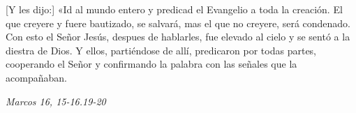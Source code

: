 \documentclass[../../devocionario.tex]{subfiles}
\begin{document}
    [Y les dijo:] «Id al mundo entero y predicad el Evangelio a toda la creación. El que creyere y fuere bautizado, 
    se salvará, mas el que no creyere, será condenado. Con esto el Señor Jesús, despues de hablarles, 
    fue elevado al cielo y se sentó a la diestra de Dios. Y ellos, partiéndose de allí, 
    predicaron por todas partes, cooperando el Señor y confirmando la palabra con las señales que la acompañaban. 

    \begin{flushright}
        \emph{Marcos 16, 15-16.19-20}
    \end{flushright}
\end{document}
